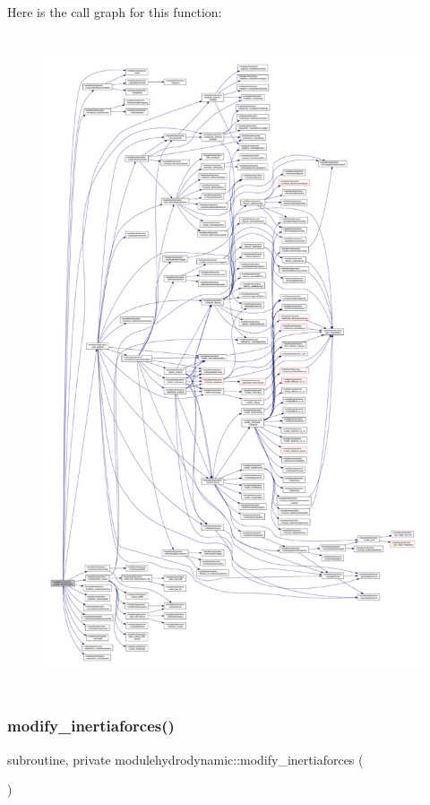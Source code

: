 Here is the call graph for this function\+:\nopagebreak
\begin{figure}[H]
\begin{center}
\leavevmode
\includegraphics[height=550pt]{namespacemodulehydrodynamic_a54656696e009a87a266514744beb5baa_cgraph}
\end{center}
\end{figure}
\mbox{\label{namespacemodulehydrodynamic_abdc575076528a23bb728d486a9919cdf}} 
\subsubsection{\texorpdfstring{modify\+\_\+inertiaforces()}{modify\_inertiaforces()}}
{\footnotesize\ttfamily subroutine, private modulehydrodynamic\+::modify\+\_\+inertiaforces (\begin{DoxyParamCaption}{ }\end{DoxyParamCaption})\hspace{0.3cm}{\ttfamily [private]}}

